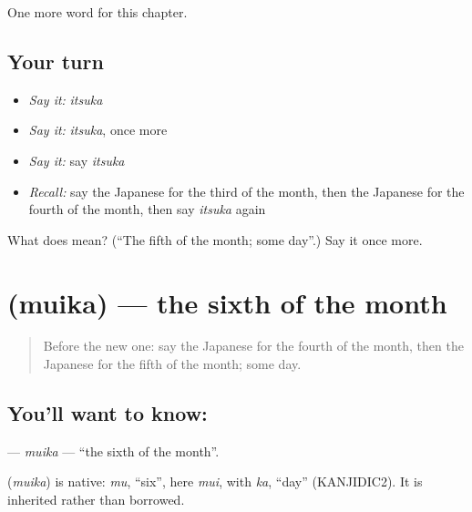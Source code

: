 \begin{grammarlens}[title={What you've built}]
One more word for this chapter.
\end{grammarlens}

\subsection*{Your turn}
\begin{itemize}
\raggedright
  \item \emph{Say it:} \emph{itsuka}
  \item \emph{Say it:} \emph{itsuka}, once more
  \item \emph{Say it:} say \emph{itsuka}
  \item \emph{Recall:} say the Japanese for the third of the month, then the Japanese for the fourth of the month, then say \emph{itsuka} again
\end{itemize}

\begin{tcolorbox}[breakable,colback=teal!4,colframe=teal!35!black,title={Before you move on}]
What does  mean? (\textquotedblleft{}The fifth of the month; some day\textquotedblright{}.) Say it once more.
\end{tcolorbox}
\section[\texorpdfstring{\ja{むいか} (muika)}{むいか (muika)}]{ (muika) — the sixth of the month}

\label{lesson:JA-C77-muika}



\begin{quote}
Before the new one: say the Japanese for the fourth of the month, then the Japanese for the fifth of the month; some day.
\end{quote}

\subsection*{You'll want to know: }
\textbf{} — \emph{muika} — \textquotedblleft{}the sixth of the month\textquotedblright{}.

\begin{cousinweb}
\textbf{} (\emph{muika}) is native: \emph{mu}, \textquotedblleft{}six\textquotedblright{}, here \emph{mui}, with \emph{ka}, \textquotedblleft{}day\textquotedblright{} (KANJIDIC2). It is inherited rather than borrowed.
\end{cousinweb}

